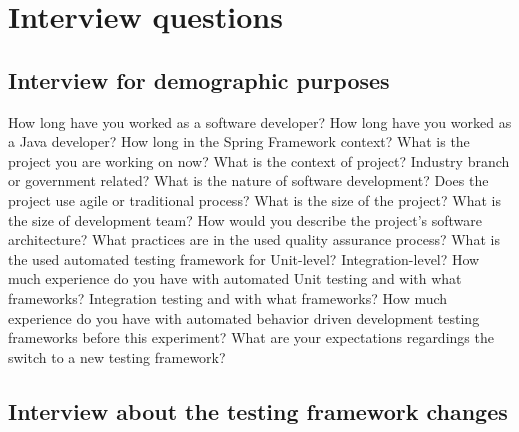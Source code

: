 \chapter{Interview questions}
\label{chapter:interview}
\section{Interview for demographic purposes}
    \label{section:demographic}
    \begin{outline}[enumerate]
    \1 How long have you worked as a software developer?
    \1 How long have you worked as a Java developer?
        \2 How long in the Spring Framework context?
    \1 What is the project you are working on now?
        \2 What is the context of project?
            \3 Industry branch or government related?
            \3 What is the nature of software development?
        \2 Does the project use agile or traditional process?
        \2 What is the size of the project?
        \2 What is the size of development team?
        \2 How would you describe the project's software architecture?
        \2 What practices are in the used quality assurance process?
        \2 What is the used automated testing framework for
            \3 Unit-level?
            \3 Integration-level?
    \1 How much experience do you have with automated
        \2 Unit testing and with what frameworks?
        \2 Integration testing and with what frameworks?
    \1 How much experience do you have with automated behavior driven development testing frameworks before this experiment?
    \1 What are your expectations regardings the switch to a new testing framework?
    \end{outline}

\section{Interview about the testing framework changes}


